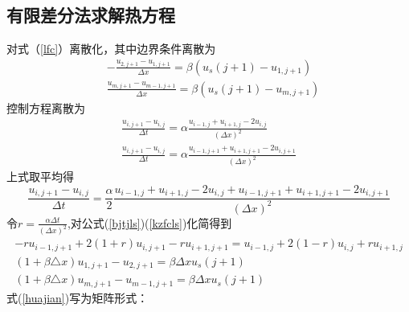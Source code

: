 \documentclass[withoutpreface,bwprint]{cumcmthesis} %
\begin{document}
	\subsection{有限差分法求解热方程}
	对式（\ref{lfc}）离散化，其中边界条件离散为
	\begin{equation}
	\label{bjtjls}
	\begin{aligned}
	&-\frac{u_{2, j+1}-u_{1, j+1}}{\Delta x}=\beta\left(u_{s}(j+1)-u_{1, j+1}\right) \\
	&\frac{u_{m, j+1}-u_{m-1, j+1}}{\Delta x}=\beta\left(u_{s}(j+1)-u_{m, j+1}\right)
	\end{aligned}
	\end{equation}
	控制方程离散为
	\begin{equation}
	\begin{gathered}
	\frac{u_{i, j+1}-u_{i, j}}{\Delta t}=\alpha \frac{u_{i-1, j}+u_{i+1, j}-2 u_{i, j}}{(\Delta x)^{2}} \\
	\frac{u_{i, j+1}-u_{i, j}}{\Delta t}=\alpha \frac{u_{i-1, j+1}+u_{i+1, j+1}-2 u_{i, j+1}}{(\Delta x)^{2}}
	\end{gathered}
	\end{equation}
	上式取平均得
	\begin{equation}
	\label{kzfcls}
	\frac{u_{i, j+1}-u_{i, j}}{\Delta t}=\frac{\alpha}{2} \frac{u_{i-1, j}+u_{i+1, j}-2 u_{i, j}+u_{i-1, j+1}+u_{i+1, j+1}-2 u_{i, j+1}}{(\Delta x)^{2}}
	\end{equation}
	令$r=\frac{\alpha \Delta t}{\left( \Delta x \right) ^2}$,对公式(\ref{bjtjls})(\ref{kzfcls})化简得到
	\begin{equation}
	\label{huajian}
	\begin{gathered}
	-r u_{i-1, j+1}+2(1+r) u_{i, j+1}-r u_{i+1, j+1}=u_{i-1, j}+2(1-r) u_{i, j}+r u_{i+1, j} \\
	(1+\beta \triangle x) u_{1, j+1}-u_{2, j+1}=\beta \Delta x u_{s}(j+1) \\
	(1+\beta \triangle x) u_{m, j+1}-u_{m-1, j+1}=\beta \Delta x u_{s}(j+1)
	\end{gathered}
	\end{equation}
	式(\ref{huajian})写为矩阵形式：
\end{document}
